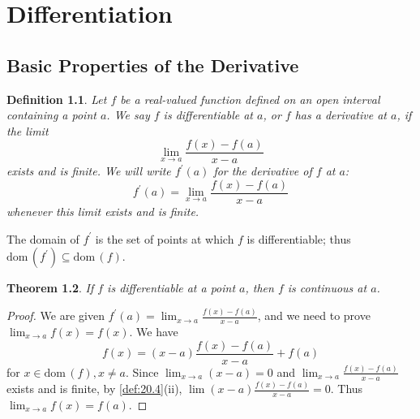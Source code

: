 \documentclass[12pt, lettersize]{book}
\newtheorem{thm}{Theorem}[section]
\newtheorem{dfn}[thm]{Definition}
\newcommand{\dom}{\text{dom}\,}
\begin{document}
	\chapter{Differentiation}
		\newpage
		\section{Basic Properties of the Derivative}
			\begin{dfn}\label{def:28.1}
			Let $f$ be a real-valued function defined on an open interval containing a point $a$. We say $f$ is \emph{differentiable} at $a$, or $f$ has a derivative at $a$, if the limit
			\begin{displaymath}
				\lim_{x\rightarrow a}\frac{f(x)-f(a)}{x-a}
			\end{displaymath}
			exists and is finite. We will write $f^\prime(a)$ for the derivative of $f$ at $a$:
			\begin{displaymath}
				f^\prime(a)=\lim_{x\rightarrow a}\frac{f(x)-f(a)}{x-a}
			\end{displaymath}
			whenever this limit exists and is finite.
			\end{dfn}
			The domain of $f^\prime$ is the set of points at which $f$ is differentiable; thus $\dom(f^\prime)\subseteq\dom(f)$.
			
			\begin{thm}\label{thm:28.2}
			If $f$ is differentiable at a point $a$, then $f$ is continuous at $a$.
			\end{thm}
			\begin{proof}
			We are given $f^\prime(a)=\lim_{x\rightarrow a}\frac{f(x)-f(a)}{x-a}$, and we need to prove $\lim_{x\rightarrow a}f(x)=f(x)$. We have 
			\begin{displaymath}
				f(x)=(x-a)\frac{f(x)-f(a)}{x-a}+f(a)
			\end{displaymath}
			for $x\in\dom(f), x\neq a$. Since $\lim_{x\rightarrow a}(x-a)=0$ and $\lim_{x\rightarrow a}\frac{f(x)-f(a)}{x-a}$ exists and is finite, by \ref{def:20.4}(ii), $\lim (x-a)\frac{f(x)-f(a)}{x-a}=0$. Thus $\lim_{x\rightarrow a}f(x)=f(a)$.
			\end{proof}
			
\end{document}
